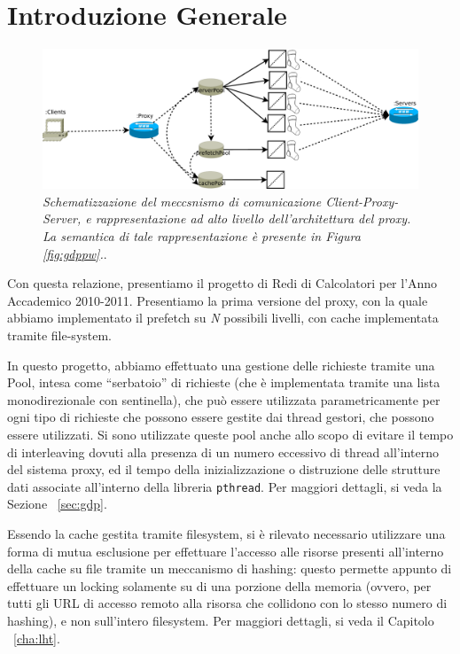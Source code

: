 \chapter{Introduzione Generale}
\begin{figure}[!th]
\begin{center}
\includegraphics[scale=0.4]{fig/fig02.pdf}
\caption{\textit{Schematizzazione del meccsnismo di comunicazione Client-Proxy-Server,
e rappresentazione ad alto livello dell'architettura del proxy. La semantica di tale
rappresentazione è presente in Figura \vref{fig:gdppw}.}.}
\end{center}
\end{figure}
Con questa relazione, presentiamo il progetto di Redi di Calcolatori per l'Anno
Accademico 2010-2011. Presentiamo la prima versione del proxy, con la quale
abbiamo implementato il prefetch su \textit{N} possibili livelli, con cache 
implementata tramite file-system.

In questo progetto, abbiamo effettuato una gestione delle richieste tramite una
Pool, intesa come ``serbatoio'' di richieste (che è implementata tramite una lista
monodirezionale con sentinella), che può essere utilizzata parametricamente
per ogni tipo di richieste che possono essere gestite dai thread gestori, che possono
essere utilizzati. Si sono utilizzate queste pool anche allo scopo di evitare il
tempo di interleaving dovuti alla presenza di un numero eccessivo di thread
all'interno del sistema proxy, ed il tempo della inizializzazione o distruzione
delle strutture dati associate all'interno della libreria \texttt{pthread}.
Per maggiori dettagli, si veda la Sezione ~\vref{sec:gdp}.

Essendo la cache gestita tramite filesystem, si è rilevato necessario utilizzare
una forma di mutua esclusione per effettuare l'accesso alle risorse presenti
all'interno della cache su file tramite un meccanismo di hashing: questo permette 
appunto di effettuare un locking solamente su di una porzione della memoria (ovvero,
per tutti gli URL di accesso remoto alla risorsa che collidono con lo stesso
numero di hashing), e non sull'intero filesystem. Per maggiori dettagli, si
veda il Capitolo ~\vref{cha:lht}.


